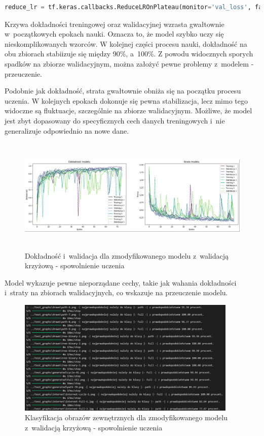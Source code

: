\begin{lstlisting}[language=Python,caption=Listing zmodyfikowanego skryptu
	znajdującego się bezpośrdenio po tworzeniu modelu z~walidacją krzyżową - wersja 4,label={tests-model-crossval4}]
	reduce_lr = tf.keras.callbacks.ReduceLROnPlateau(monitor='val_loss', factor=0.2, patience=5, min_lr=0.001)
\end{lstlisting}

Krzywa dokładności treningowej oraz walidacyjnej wzrasta gwałtownie w~początkowych epokach nauki.
Oznacza to, że model szybko uczy się nieskomplikowanych wzorców.
W kolejnej części procesu nauki, dokładność na obu zbiorach stabiizuje się między 90\%, a~100\%.
Z powodu widocznych sporych spadków na zbiorze walidacyjnym, można założyć pewne problemy z~modelem - przeuczenie.

Podobnie jak dokładność, strata gwałtownie obniża się na początku procesu uczenia.
W kolejnych epokach dokonuje się pewna stabilizacja, lecz mimo tego widoczne są fluktuacje, szczególnie na zbiorze walidacyjnym.
Możliwe, że model jest zbyt dopasowany do specyficznych cech danych treningowych i~nie generalizuje odpowiednio na nowe dane.

\begin{figure}[ht]
	\centering
	\includegraphics[height=5.5cm]{resources/tests/images/v4/crossvalid_4_img.png}
	\caption{Dokładność i~walidacja dla zmodyfikowanego modelu z~walidacją krzyżową - spowolnienie uczenia}
	\label{Fig:tests-cv-4a}
\end{figure}
\FloatBarrier

Model wykazuje pewne nieporządane cechy, takie jak wahania dokładności i~straty na zbiorach walidacyjnych,
co wskazuje na przeuczenie modelu.

\begin{figure}[ht]
	\centering
	\includegraphics[height=5.5cm]{resources/tests/images/v4/crossvalid_4_txt.png}
	\caption{Klasyfikacja obrazów zewnętrznych dla zmodyfikowanego modelu z~walidacją krzyżową - spowolnienie uczenia}
	\label{Fig:tests-cv-4b}
\end{figure}
\FloatBarrier

